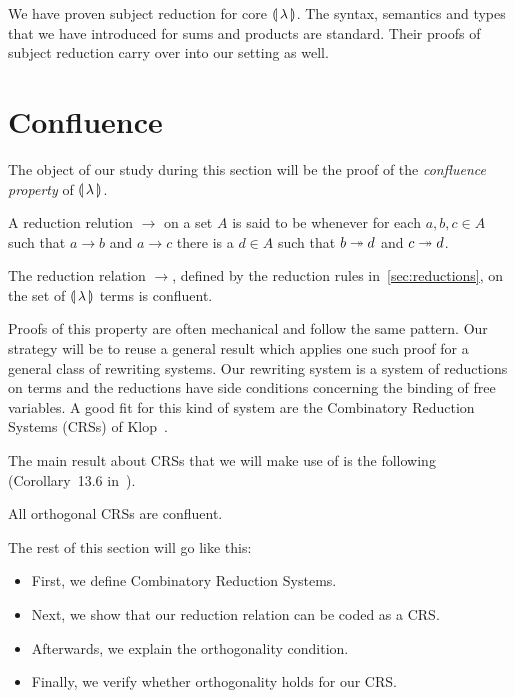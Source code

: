 We have proven subject reduction for core $\llparenthesis \, \lambda \, \rrparenthesis$. The syntax,
semantics and types that we have introduced for sums and products are
standard. Their proofs of subject reduction carry over into our setting as
well.


\section{Confluence}
\label{sec:confluence}

The object of our study during this section will be the proof of the
\emph{confluence property} of $\llparenthesis \, \lambda \, \rrparenthesis$.

\begin{definition}
  A reduction relution $\to$ on a set $A$ is said to be 
  whenever for each $a,b,c \in A$ such that $a \to b$ and $a \to c$ there
  is a $d \in A$ such that $b \twoheadrightarrow d$ and $c \twoheadrightarrow d$.
\end{definition}

\begin{theorem}\label{thm:confluence}
  
  The reduction relation $\to$, defined by the reduction rules
  in~\ref{sec:reductions}, on the set of $\llparenthesis \, \lambda \, \rrparenthesis$ terms is
  confluent.
\end{theorem}

Proofs of this property are often mechanical and follow the same
pattern. Our strategy will be to reuse a general result which applies one
such proof for a general class of rewriting systems. Our rewriting system
is a system of reductions on terms and the reductions have side conditions
concerning the binding of free variables. A good fit for this kind of
system are the Combinatory Reduction Systems (CRSs) of
Klop~\cite{klop1993combinatory}.

The main result about CRSs that we will make use of is the following
(Corollary~13.6 in~\cite{klop1993combinatory}).

\begin{theorem}\label{thm:confluence-crs}

  All orthogonal CRSs are confluent.
\end{theorem}

The rest of this section will go like this:
\begin{itemize}
\item First, we define Combinatory Reduction Systems.
\item Next, we show that our reduction relation can be coded as a CRS.
\item Afterwards, we explain the orthogonality condition.
\item Finally, we verify whether orthogonality holds for our CRS.
\end{itemize}


